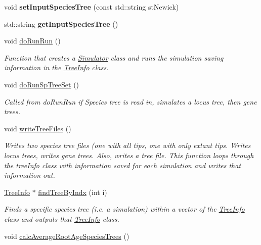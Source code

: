 \begin{DoxyCompactItemize}
\mbox{\label{class_engine_af9fe3e8fd1029f641270451453fddf4c}} 
void {\bfseries set\+Input\+Species\+Tree} (const std\+::string st\+Newick)
\item 
\mbox{\label{class_engine_a2e29105d50c6ae710f3293a113ac16a4}} 
std\+::string {\bfseries get\+Input\+Species\+Tree} ()
\item 
void \mbox{\hyperlink{class_engine_a667304a3ace7fdeed09186f1fa35794b}{do\+Run\+Run}} ()
\begin{DoxyCompactList}\small\item\em Function that creates a \mbox{\hyperlink{class_simulator}{Simulator}} class and runs the simulation saving information in the \mbox{\hyperlink{class_tree_info}{Tree\+Info}} class. \end{DoxyCompactList}\item 
void \mbox{\hyperlink{class_engine_ae91f74b568f58b564179882def6b8779}{do\+Run\+Sp\+Tree\+Set}} ()
\begin{DoxyCompactList}\small\item\em Called from do\+Run\+Run if Species tree is read in, simulates a locus tree, then gene trees. \end{DoxyCompactList}\item 
void \mbox{\hyperlink{class_engine_a18d3fc6bf175c803bb7155f9372c16df}{write\+Tree\+Files}} ()
\begin{DoxyCompactList}\small\item\em Writes two species tree files (one with all tips, one with only extant tips. Writes locus trees, writes gene trees. Also, writes a tree file. This function loops through the tree\+Info class with information saved for each simulation and writes that information out. \end{DoxyCompactList}\item 
\mbox{\hyperlink{class_tree_info}{Tree\+Info}} $\ast$ \mbox{\hyperlink{class_engine_a52bf7ab3f2483fd8494311627c278efe}{find\+Tree\+By\+Indx}} (int i)
\begin{DoxyCompactList}\small\item\em Finds a specific species tree (i.\+e. a simulation) within a vector of the \mbox{\hyperlink{class_tree_info}{Tree\+Info}} class and outputs that \mbox{\hyperlink{class_tree_info}{Tree\+Info}} class. \end{DoxyCompactList}\item 
void \mbox{\hyperlink{class_engine_ab7a0c2386843e3671a8df154566733f7}{calc\+Average\+Root\+Age\+Species\+Trees}} ()

\end{DoxyCompactItemize}
